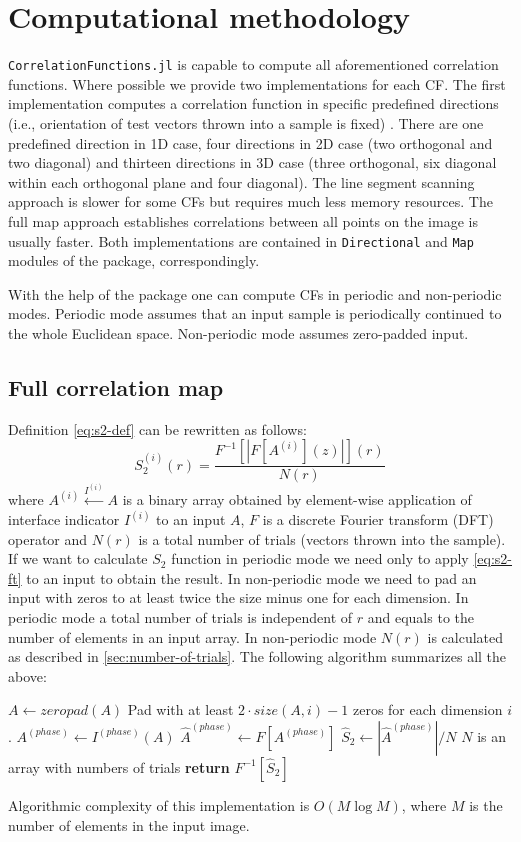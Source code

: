 \documentclass[reprint,amsmath,amssymb,aps,pre,showkeys,showpacs,nofootinbib]{revtex4-1}
\newcommand{\code}[1]{\colorbox{light-gray}{\texttt{#1}}}
\begin{document}
\section{Computational methodology}

\code{CorrelationFunctions.jl} is capable to compute all aforementioned
correlation functions. Where possible we provide two implementations for each
CF. The first implementation computes a correlation function in specific
predefined directions (i.e., orientation of test vectors thrown into a sample is
fixed) \cite{jiao2014chawla,EPL1}.  There are one predefined direction in 1D
case, four directions in 2D case (two orthogonal and two diagonal) and thirteen
directions in 3D case (three orthogonal, six diagonal within each orthogonal
plane and four diagonal). The line segment scanning approach is slower for some
CFs but requires much less memory resources. The full map approach establishes
correlations between all points on the image is usually faster.  Both
implementations are contained in \code{Directional} and \code{Map} modules of
the package, correspondingly.

With the help of the package one can compute CFs in periodic and non-periodic
modes.  Periodic mode assumes that an input sample is periodically continued to
the whole Euclidean space. Non-periodic mode assumes zero-padded input.

\subsection{Full correlation map}
\label{sec:map}
Definition \cref{eq:s2-def} can be rewritten as follows:
\begin{equation}
  S_2^{(i)}(r) = \frac{F^{-1} [|F [A^{(i)}](z)|] (r)}{N(r)} \label{eq:s2-ft}
\end{equation}
where $A^{(i)} \xleftarrow{I^{(i)}} A$ is a binary array obtained by element-wise
application of interface indicator $I^{(i)}$ to an input $A$, $F$ is a discrete
Fourier transform (DFT) operator and $N(r)$ is a total number of trials (vectors
thrown into the sample). If we want to calculate $S_2$ function in periodic mode
we need only to apply \cref{eq:s2-ft} to an input to obtain the result. In
non-periodic mode we need to pad an input with zeros to at least twice the size
minus one for each dimension. In periodic mode a total number of trials is
independent of $r$ and equals to the number of elements in an input array. In
non-periodic mode $N(r)$ is calculated as described in
\cref{sec:number-of-trials}. The following algorithm summarizes all the above:
\begin{algorithmic}[1]
  \State $A \gets zeropad(A)$
  \Comment Pad with at least $2\cdot size(A, i) - 1$ zeros for each dimension $i$.
  \EndIf
  \State $A^{(phase)} \gets I^{(phase)} (A)$
  \State $\hat{A}^{(phase)} \gets F[A^{(phase)}]$
  \State $\hat{S}_2 \gets |\hat{A}^{(phase)}| / N$
  \Comment $N$ is an array with numbers of trials
  \State \textbf{return} $F^{-1} [\hat{S}_2]$
  \EndProcedure
\end{algorithmic}
Algorithmic complexity of this implementation is $O(M \log M)$, where $M$ is the
number of elements in the input image.
\end{document}
